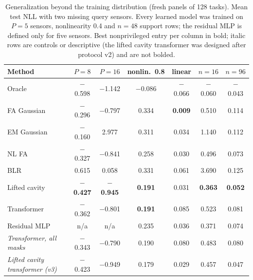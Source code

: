 \begin{table}[t]
\centering\small
\setlength{\tabcolsep}{5pt}
\caption{\label{tab:shift}Generalization beyond the training distribution (fresh panels of 128 tasks). Mean test NLL with two missing query sensors. Every learned model was trained on $P{=}5$ sensors, nonlinearity 0.4 and $n{=}48$ support rows; the residual MLP is defined only for five sensors. Best nonprivileged entry per column in bold; italic rows are controls or descriptive (the lifted cavity transformer was designed after protocol v2) and are not bolded.}
\begin{tabular}{lcccccc}
\toprule
Method & $P{=}8$ & $P{=}16$ & nonlin.\ 0.8 & linear & $n{=}16$ & $n{=}96$\\
\midrule
Oracle & $-$0.598 & $-$1.142 & $-$0.086 & $-$0.066 & $-$0.060 & $-$0.043\\\midrule
FA Gaussian & $-$0.296 & $-$0.797 & 0.334 & \textbf{0.009} & 0.510 & 0.114\\
EM Gaussian & $-$0.160 & 2.977 & 0.311 & 0.034 & 1.140 & 0.112\\
NL FA & $-$0.327 & $-$0.841 & 0.258 & 0.030 & 0.496 & 0.073\\
BLR & 0.615 & 0.058 & 0.331 & 0.061 & 3.690 & 0.125\\
Lifted cavity & \textbf{$-$0.427} & \textbf{$-$0.945} & \textbf{0.191} & 0.031 & \textbf{0.363} & \textbf{0.052}\\
Transformer & $-$0.362 & $-$0.801 & \textbf{0.191} & 0.085 & 0.523 & 0.081\\
Residual MLP & n/a & n/a & 0.235 & 0.036 & 0.371 & 0.074\\
\emph{Transformer, all masks} & $-$0.343 & $-$0.790 & 0.190 & 0.080 & 0.483 & 0.080\\
\emph{Lifted cavity transformer (v3)} & $-$0.423 & $-$0.949 & 0.179 & 0.029 & 0.457 & 0.047\\
\bottomrule
\end{tabular}
\end{table}
